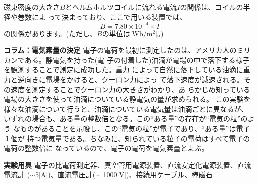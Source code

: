磁束密度の大きさ$B$とヘルムホルツコイルに流れる電流$I$の関係は、コイルの半径や巻数によ
って決まっており、ここで用いる装置では、
\begin{equation}
\boxed{
B=7.80\times 10^{-4}\times I
}
\end{equation}
の関係があります。(ただし、$B$の単位は[Wb/m${}^2$]。) 



\bigskip

\begin{itembox}[l]{\bf コラム：電気素量の決定}
電子の電荷を最初に測定したのは、アメリカ人のミリカンである。静電気を持った(電
子の付着した)油滴が電場の中で落下する様子を観測することで測定に成功した。重力
によって自然に落下している油滴に重力と逆向きに電場をかけると、クーロン力によっ
て落下速度が減速される。その速度を測定することでクーロン力の大きさがわかり、あ
らかじめ知っている電場の大きさを使って油滴についている静電気の量が求められる。
この実験を様々な油滴について行うと、油滴についている電気量は油滴ごとに異なるが、
いずれの場合も、ある量の整数倍となる。この``ある量''の存在が``電気の粒''のよう
なものがあることを示唆し、この``電気の粒''が電子であり、``ある量''は電子１個が
持つ電気量である。ちなみに、知られている粒子の電荷はすべて電子の電荷の整数倍に
なっているので、電子の電荷を電気素量とよぶ。
\end{itembox}

\newpage

\jikken

\begin{itemsquarebox}[c]{\bf 実験用具}
電子の比電荷測定器、真空管用電源装置、直流安定化電源装置、直流電流計
($\sim$5[A])、直流電圧計($\sim$ 1000[V])、接続用ケーブル、棒磁石
\end{itemsquarebox}

\bigskip


